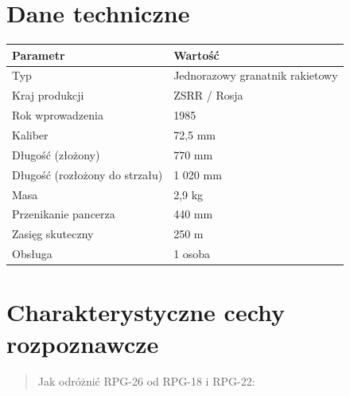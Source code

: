 \documentclass[12pt,openany,oneside]{book}
\begin{document}
\section{Dane techniczne}\label{dane-techniczne-71}

\begin{longtable}[]{@{}ll@{}}
\toprule\noalign{}
Parametr & Wartość \\
\midrule\noalign{}
\endhead
\bottomrule\noalign{}
\endlastfoot
Typ & Jednorazowy granatnik rakietowy \\
Kraj produkcji & ZSRR / Rosja \\
Rok wprowadzenia & 1985 \\
Kaliber & 72,5 mm \\
Długość (złożony) & 770 mm \\
Długość (rozłożony do strzału) & 1 020 mm \\
Masa & 2,9 kg \\
Przenikanie pancerza & 440 mm \\
Zasięg skuteczny & 250 m \\
Obsługa & 1 osoba \\
\end{longtable}

\section{Charakterystyczne cechy
rozpoznawcze}\label{charakterystyczne-cechy-rozpoznawcze-71}

\begin{quote}
Jak odróżnić RPG-26 od RPG-18 i RPG-22:
\end{quote}
\end{document}
